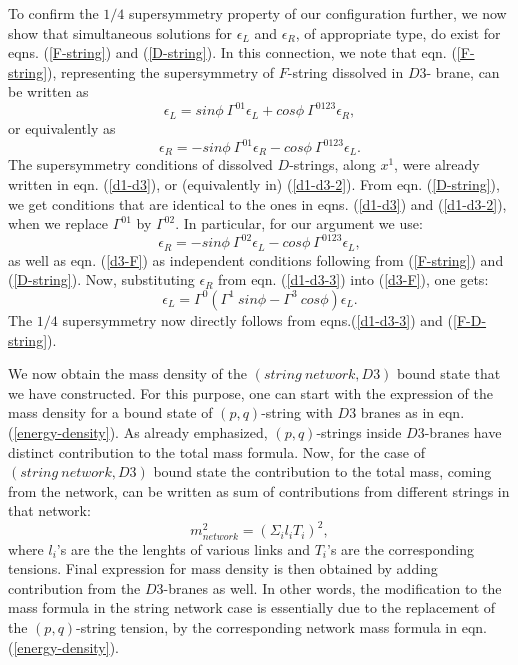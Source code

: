 \documentclass[a4paper,12pt]{article}
\begin{document}
To confirm the $1/4$ supersymmetry property of our configuration 
further, we now show that 
simultaneous solutions for $\epsilon_L$ and $\epsilon_R$, 
of appropriate type, do exist for eqns. (\ref{F-string}) 
and (\ref{D-string}). In this connection, we note that
eqn. (\ref{F-string}), representing 
the supersymmetry of $F$-string dissolved in $D3$-
brane, can be written as 
\begin{equation}
\epsilon_L = sin \phi~\Gamma^{0 1} \epsilon_L 
            + cos \phi~\Gamma^{0 1 2 3}\epsilon_R,
\label{d3-F}
\end{equation}
or equivalently as
\begin{equation}
\epsilon_R = - sin \phi~\Gamma^{0 1} \epsilon_R 
             - cos \phi~\Gamma^{0 1 2 3}\epsilon_L.
\label{d3-F-2}
\end{equation}
The supersymmetry conditions of dissolved $D$-strings, along $x^1$,
were already written in eqn. (\ref{d1-d3}), or (equivalently in) 
(\ref{d1-d3-2}).
From eqn. (\ref{D-string}), we get conditions that are 
identical to the ones in eqns. (\ref{d1-d3}) and (\ref{d1-d3-2}),
when we replace $\Gamma^{0 1}$ by $\Gamma^{0 2}$.
In particular, for our argument we use:
\begin{equation} 
\epsilon_R = - sin\phi ~\Gamma^{0 2} \epsilon_L 
              - cos \phi ~\Gamma^{0 1 2 3} \epsilon_L,
\label{d1-d3-3}
\end{equation}
as well as eqn. (\ref{d3-F}) as independent conditions
following from (\ref{F-string}) and (\ref{D-string}). Now, substituting 
$\epsilon_R$ from eqn. (\ref{d1-d3-3}) into
(\ref{d3-F}), one gets:
\begin{equation}
\epsilon_L = \Gamma^0(\Gamma^1~sin\phi - \Gamma^3~cos\phi)\epsilon_L.
\label{F-D-string}
\end{equation}
The $1/4$ supersymmetry now directly follows from eqns.(\ref{d1-d3-3})
and (\ref{F-D-string}). 

We now obtain the mass density of 
the $(string~network, D3)$ bound state 
that we have constructed. For this purpose, one can start with the
expression of the mass density for a bound state of 
$(p, q)$-string with $D3$ branes as in eqn.(\ref{energy-density}).
As already emphasized, $(p, q)$-strings inside $D3$-branes have
distinct contribution to the total mass formula. 
Now, for the case of $(string~network, D3)$ bound state
the contribution to the total mass, coming from the network, 
can be written as sum of
contributions from different strings in that network\cite{sen}: 
\begin{equation}
m_{network}^2 = (\Sigma_i l_i T_i)^2,
\end{equation}
where $l_i$'s are the the lenghts of various links and $T_i$'s are 
the corresponding tensions. Final expression for mass density
is then obtained by
adding contribution from the $D3$-branes as well. In other words, 
the modification to the mass formula in the string network case
is essentially due to the replacement of the $(p, q)$-string tension, by 
the corresponding network mass formula in eqn. (\ref{energy-density}).
\end{document}
